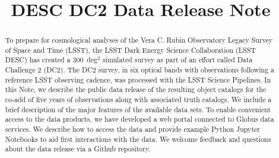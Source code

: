 \documentclass[modern]{descnote}
\begin{document}
\title{DESC DC2 Data Release Note}


\begin{abstract}

To prepare for cosmological analyses of the Vera C. Rubin Observatory Legacy Survey of Space and Time (LSST), the LSST Dark Energy Science Collaboration (LSST DESC) has created a 300~deg$^2$ simulated survey as part of an effort called Data Challenge 2 (DC2).  The DC2 survey, in six optical bands with observations following a reference LSST observing cadence, was processed with the LSST Science Pipelines.  In this Note, we describe the public data release of the resulting object catalogs for the co-add of five years of observations along with associated truth catalogs. We include a brief description of the major features of the available data sets. To enable convenient access to the data products, we have developed a web portal connected to Globus data services. We describe how to access the data and provide example Python Jupyter Notebooks to aid first interactions with the data.  We welcome feedback and questions about the data release via a Github repository.



\end{abstract}
\end{document}
